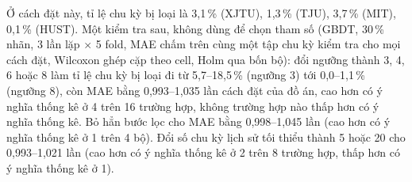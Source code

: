 Ở cách đặt này, tỉ lệ chu kỳ bị loại là 3{,}1\,\% (XJTU), 1{,}3\,\% (TJU), 3{,}7\,\% (MIT), 0{,}1\,\% (HUST). Một kiểm tra sau, không dùng để chọn tham số (GBDT, 30\,\% nhãn, 3 lần lặp $\times$ 5 fold, MAE chấm trên cùng một tập chu kỳ kiểm tra cho mọi cách đặt, Wilcoxon ghép cặp theo cell, Holm qua bốn bộ): đổi ngưỡng thành 3, 4, 6 hoặc 8 làm tỉ lệ chu kỳ bị loại đi từ 5{,}7--18{,}5\,\% (ngưỡng 3) tới 0{,}0--1{,}1\,\% (ngưỡng 8), còn MAE bằng 0{,}993--1{,}035 lần cách đặt của đồ án, cao hơn có ý nghĩa thống kê ở 4 trên 16 trường hợp, không trường hợp nào thấp hơn có ý nghĩa thống kê. Bỏ hẳn bước lọc cho MAE bằng 0{,}998--1{,}045 lần (cao hơn có ý nghĩa thống kê ở 1 trên 4 bộ). Đổi số chu kỳ lịch sử tối thiểu thành 5 hoặc 20 cho 0{,}993--1{,}021 lần (cao hơn có ý nghĩa thống kê ở 2 trên 8 trường hợp, thấp hơn có ý nghĩa thống kê ở 1).

